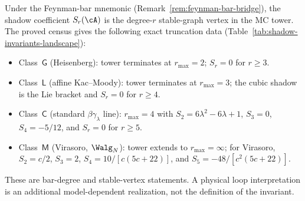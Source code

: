 \begin{remark}
\label{rem:feynman-shadow-loop-dictionary}
Under the Feynman-bar mnemonic
(Remark~\ref{rem:feynman-bar-bridge}), the shadow coefficient
$S_r(\cA)$ is the degree-$r$ stable-graph vertex in the MC tower.
The proved census gives the following exact truncation data
(Table~\ref{tab:shadow-invariants-landscape}):
\begin{itemize}
\item Class~$\mathsf{G}$ (Heisenberg): tower terminates at
 $r_{\max} = 2$; $S_r = 0$ for $r \geq 3$.
\item Class~$\mathsf{L}$ (affine Kac--Moody): tower terminates at
 $r_{\max} = 3$; the cubic shadow is the Lie bracket and
 $S_r = 0$ for $r \geq 4$.
\item Class~$\mathsf{C}$ (standard $\beta\gamma_\lambda$ line):
 $r_{\max} = 4$ with
 $S_2 = 6\lambda^2 - 6\lambda + 1$, $S_3 = 0$,
 $S_4 = -5/12$, and $S_r = 0$ for $r \geq 5$.
\item Class~$\mathsf{M}$ (Virasoro, $\Walg_N$): tower extends to
 $r_{\max} = \infty$; for Virasoro,
 $S_2=c/2$, $S_3=2$,
 $S_4=10/[c(5c+22)]$, and
 $S_5=-48/[c^2(5c+22)]$.
\end{itemize}
These are bar-degree and stable-vertex statements.  A physical loop
interpretation is an additional model-dependent realization, not the
definition of the invariant.
\end{remark}

